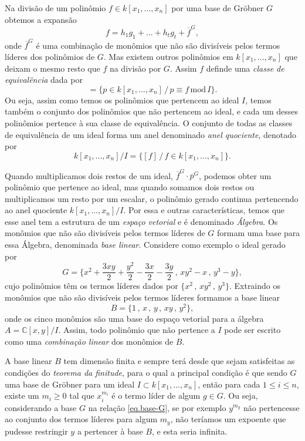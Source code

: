 Na divisão de um polinômio $f\in k[x_1,...,x_n]$ por uma base de Gr\"obner $G$ obtemos a expansão
\begin{equation*}
f=h_1g_1+...+h_tg_t+\overline{f}^G,
\end{equation*} 
onde $\overline{f}^G$ é uma combinação de monômios que não são divisíveis pelos termos líderes dos polinômios de $G$. Mas existem outros polinômios em $k[x_1,...,x_n]$ que deixam o mesmo resto que $f$ na divisão por $G$. Assim $f$ definde uma {\it classe de equivalência} dada por
\begin{equation*}
[f]=\{p\in k[x_1,...,x_n]\,/\,p\equiv f\, \text{mod}\, I\}.
\end{equation*}
Ou seja, assim como temos os polinômios que pertencem ao ideal $I$, temos também o conjunto dos polinômios que não pertencem ao ideal, e cada um desses polinômios pertence à sua classe de equivalência. O conjunto de todas as classes de equivalência de um ideal forma um anel denominado {\it anel quociente}, denotado por
\begin{equation*}
k[x_1,...,x_n]/I=\{[f]\,/\,f\in k[x_1,...,x_n]\}.
\end{equation*}

Quando multiplicamos dois restos de um ideal, $\overline{f}^G\cdot\overline{p}^G$, podemos obter um polinômio que pertence ao ideal, mas quando somamos dois restos ou multiplicamos um resto por um escalar, o polinômio gerado continua pertencendo ao anel quociente $k[x_1,...,x_n]/I$. Por essa e outras características, temos que esse anel tem a estrutura de um {\it espaço vetorial} e é denominado {\it Álgebra}. Os monômios que não são divisíveis pelos termos líderes de $G$ formam uma base para essa Álgebra, denominada {\it base linear}. Considere como exemplo o ideal gerado por 
\begin{equation}\label{eq.base-G}
G=\{x^2+\frac{3xy}{2}+\frac{y^2}{2}-\frac{3x}{2}-\frac{3y}{2}\,,\,xy^2-x\,,\,y^3-y\},
\end{equation}
cujo polinômios têm os termos líderes dados por $\{x^2\,,\,xy^2\,,\,y^3\}$. Extraindo os monômios que não são divisíveis pelos termos líderes formamos a base linear
\begin{equation*}
B=\{1\,,\,x\,,\,y\,,\,xy\,,\,y^2\},
\end{equation*}
onde os cinco monômios são uma base do espaço vetorial para a álgebra $A={\mathbb C}[x,y]/I$. Assim, todo polinômio que não pertence a $I$ pode ser escrito como uma {\it combinação linear} dos monômios de $B$.

A base linear $B$ tem dimensão finita e sempre terá desde que sejam satisfeitas as condições do {\it teorema da finitude}, para o qual a principal condição é que sendo $G$ uma base de Gr\"obner para um ideal $I \subset k[x_1,...,x_n]$, então para cada $1\le i\le n$, existe um $m_i\ge 0$ tal que $x_i^{m_i}$ é o termo líder de algum $g\in G$. Ou seja, considerando a base $G$ na relação \ref{eq.base-G}, se por exemplo $y^{m_y}$ não pertencesse ao conjunto dos termos líderes para algum $m_y$, não teríamos um expoente que pudesse restringir $y$ a pertencer à base $B$, e esta seria infinita.

